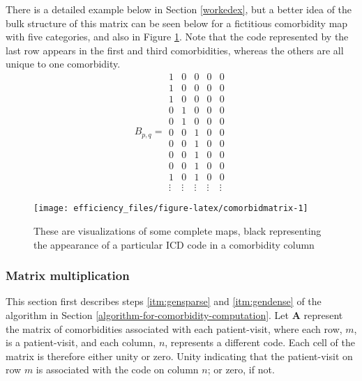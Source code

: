 \documentclass[article]{jss}
\begin{document}
There is a detailed example below in Section \ref{workedex}, but a
better idea of the bulk structure of this matrix can be seen below for a
fictitious comorbidity map with five categories, and also in Figure
\ref{fig:comorbidmatrix}. Note that the code represented by the last row
appears in the first and third comorbidities, whereas the others are all
unique to one comorbidity. \[ B_{p,q} =
\begin{matrix}
1 & 0 & 0 & 0 & 0 \\
1 & 0 & 0 & 0 & 0 \\
1 & 0 & 0 & 0 & 0 \\
0 & 1 & 0 & 0 & 0 \\
0 & 1 & 0 & 0 & 0 \\
0 & 0 & 1 & 0 & 0 \\
0 & 0 & 1 & 0 & 0 \\
0 & 0 & 1 & 0 & 0 \\
0 & 0 & 1 & 0 & 0 \\
1 & 0 & 1 & 0 & 0 \\
\vdots & \vdots & \vdots & \vdots & \vdots
\end{matrix}\]\label{eq:bulk}

\begin{CodeChunk}
\begin{figure}

{\centering \texttt{[image: efficiency\_files/figure-latex/comorbidmatrix-1]} 

}

\caption[These are visualizations of some complete maps, black representing the appearance of a particular ICD code in a comorbidity column]{These are visualizations of some complete maps, black representing the appearance of a particular ICD code in a comorbidity column}\label{fig:comorbidmatrix}
\end{figure}
\end{CodeChunk}

\hypertarget{matrix-multiplication}{%
\subsubsection{Matrix multiplication}\label{matrix-multiplication}}

This section first describes steps \ref{itm:gensparse} and
\ref{itm:gendense} of the algorithm in Section
\ref{algorithm-for-comorbidity-computation}. Let \(\boldsymbol{A}\)
represent the matrix of comorbidities associated with each
patient-visit, where each row, \(m\), is a patient-visit, and each
column, \(n\), represents a different code. Each cell of the matrix is
therefore either unity or zero. Unity indicating that the patient-visit
on row \(m\) is associated with the code on column \(n\); or zero, if
not.
\end{document}
